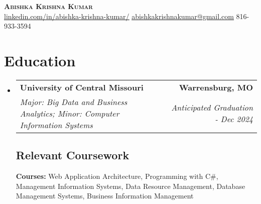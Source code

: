 \documentclass[letterpaper,11pt]{article}
\makeatletter
\newcommand{\resumeSubheading}[4]{
  \vspace{-2pt}\item
    \begin{tabular*}{0.97\textwidth}[t]{l@{\extracolsep{\fill}}r}
      \textbf{#1} & #2 \\
      \textit{\small#3} & \textit{\small #4} \\
    \end{tabular*}\vspace{-7pt}
}
\newcommand{\resumeSubHeadingListStart}{\begin{itemize}[leftmargin=0.15in, label={}]}
\newcommand{\resumeSubHeadingListEnd}{\end{itemize}}
\makeatother
\begin{document}
\begin{flushright}
    \color{gray}
    \item
\end{flushright}

\vspace{-5pt}

\begin{center}
    \textbf{\Huge \scshape Abishka Krishna Kumar} \\ \vspace{8pt}
    \small
    \href{https://www.linkedin.com/in/abishka-krishna-kumar/}{\underline{linkedin.com/in/abishka-krishna-kumar/}}
    \href{mailto:abishkakrishnakumar@gmail.com}
    {\underline{abishkakrishnakumar@gmail.com}}
    816-933-3594\\
\end{center}

\section{Education}
\resumeSubHeadingListStart

\resumeSubheading
{University of Central Missouri}{\bfseries Warrensburg, MO}
{Major: Big Data and Business Analytics; Minor: Computer Information Systems}{Anticipated Graduation - Dec 2024}
\vspace{-10pt}

\subsection{Relevant Coursework}
\textbf{Courses:} Web Application Architecture, Programming with C\#, Management Information Systems, Data Resource Management, Database Management Systems, Business Information Management

\resumeSubHeadingListEnd

\end{document}
